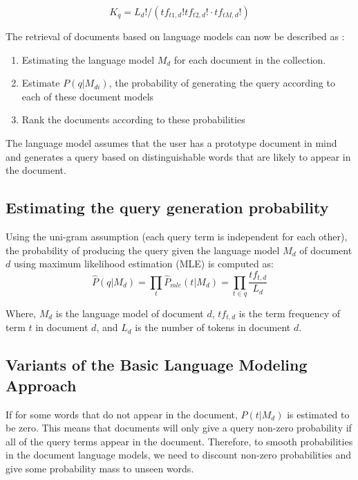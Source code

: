 \documentclass[draftcls, onecolumn, 11pt]{IEEEtran}
\begin{document}
\begin{equation}
K_q=L_d!/ (tf_{t1,d}! tf_{t2,d}!\cdot tf_{tM,d}!)
\end{equation}

The retrieval of documents based on language models can now be described as :
\begin{enumerate}
\item Estimating the language model $M_d$ for each document in the collection.
\item Estimate $P(q|M_{di})$, the probability of generating the query according to each of these document models
\item Rank the documents according to these probabilities

\end{enumerate}
The language model assumes that the user has a prototype document in mind and generates a query based on distinguishable words that are likely to appear in the document.

\vspace{8pt}
\subsection{Estimating the query generation probability} Using the uni-gram assumption (each query term is independent for each other), the probability of producing the query given the language model $M_d$ of document $d$ using maximum likelihood estimation (MLE) is computed as:
\begin{equation}
\hat{P}(q|M_d)= \prod_{t} \hat{P}_{mle}(t|M_d)=\prod_{t\in q} \frac{tf_{t,d}}{L_d}
\end{equation}

\noindent Where, $M_d$ is the language model of document $d$, $tf_{t,d}$ is the term frequency of term $t$ in document $d$, and $L_d$ is the number of tokens in document $d$.

\vspace{8pt}
\subsection{Variants of the Basic Language Modeling Approach}
If for some words that do not appear in the document, $P(t|M_d)$ is estimated to be zero. This means that documents will only give a query non-zero probability if all of the query terms appear in the document.  Therefore, to smooth probabilities in the document language models, we need to discount non-zero probabilities and give some probability mass to unseen words.
\end{document}
